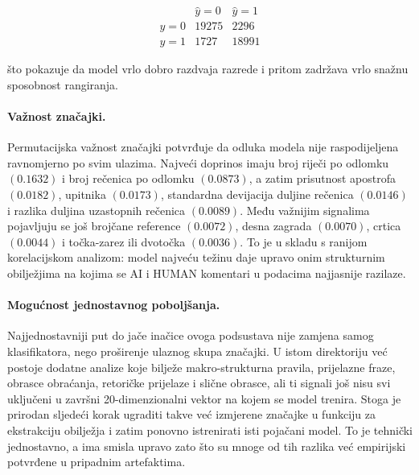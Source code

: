 \[
\begin{array}{c|cc}
 & \hat y=0 & \hat y=1 \\
\hline
y=0 & 19275 & 2296 \\
y=1 & 1727 & 18991
\end{array}
\]

što pokazuje da model vrlo dobro razdvaja razrede i pritom zadržava vrlo snažnu sposobnost rangiranja.

\paragraph{Važnost značajki.}
Permutacijska važnost značajki potvrđuje da odluka modela nije raspodijeljena ravnomjerno po svim ulazima. Najveći doprinos imaju broj riječi po odlomku $(0.1632)$ i broj rečenica po odlomku $(0.0873)$, a zatim prisutnost apostrofa $(0.0182)$, upitnika $(0.0173)$, standardna devijacija duljine rečenica $(0.0146)$ i razlika duljina uzastopnih rečenica $(0.0089)$. Među važnijim signalima pojavljuju se još brojčane reference $(0.0072)$, desna zagrada $(0.0070)$, crtica $(0.0044)$ i točka-zarez ili dvotočka $(0.0036)$. To je u skladu s ranijom korelacijskom analizom: model najveću težinu daje upravo onim strukturnim obilježjima na kojima se AI i HUMAN komentari u podacima najjasnije razilaze.

\paragraph{Mogućnost jednostavnog poboljšanja.}
Najjednostavniji put do jače inačice ovoga podsustava nije zamjena samog klasifikatora, nego proširenje ulaznog skupa značajki. U istom direktoriju već postoje dodatne analize koje bilježe makro-strukturna pravila, prijelazne fraze, obrasce obraćanja, retoričke prijelaze i slične obrasce, ali ti signali još nisu svi uključeni u završni 20-dimenzionalni vektor na kojem se model trenira. Stoga je prirodan sljedeći korak ugraditi takve već izmjerene značajke u funkciju za ekstrakciju obilježja i zatim ponovno istrenirati isti pojačani model. To je tehnički jednostavno, a ima smisla upravo zato što su mnoge od tih razlika već empirijski potvrđene u pripadnim artefaktima.